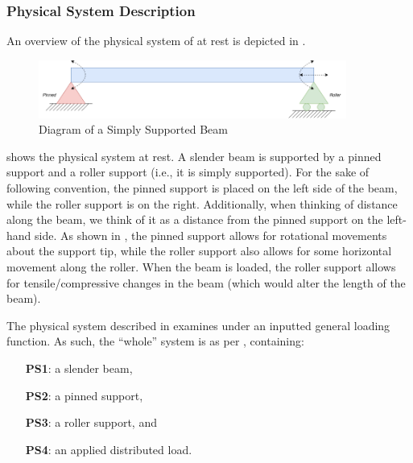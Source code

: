 \documentclass[12pt]{article}
\begin{document}
\subsubsection{Physical System Description}
\label{sec_phySystDescrip}

An overview of the physical system of \progname{} at rest is depicted in
.

\begin{figure}[H]
    \begin{center}
        \includegraphics[width=0.9\textwidth]{temp/beam_bending_diagram.drawio.png}
        \caption{\label{beam_bending_diagram} Diagram of a Simply Supported Beam}
    \end{center}
\end{figure}

 shows the physical system at rest. A slender beam is
supported by a pinned support and a roller support (i.e., it is simply
supported). For the sake of following convention, the pinned support is placed
on the left side of the beam, while the roller support is on the right.
Additionally, when thinking of distance along the beam, we think of it as a
distance from the pinned support on the left-hand side. As shown in
, the pinned support allows for rotational movements
about the support tip, while the roller support also allows for some horizontal
movement along the roller. When the beam is loaded, the roller support allows
for tensile/compressive changes in the beam (which would alter the length of the
beam).

The physical system described in \progname{} examines
 under an inputted general loading function. As such,
the ``whole'' system is as per ,
containing:

\begin{itemize}

    \item[\textbf{PS1}:] a slender beam,

    \item[\textbf{PS2}:] a pinned support,

    \item[\textbf{PS3}:] a roller support, and

    \item[\textbf{PS4}:] an applied distributed load.

\end{itemize}
\end{document}
